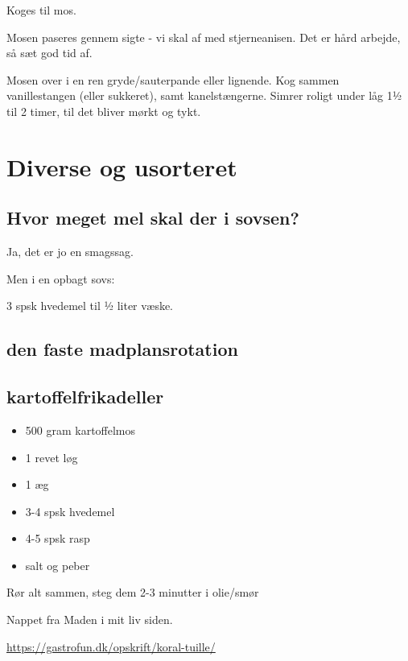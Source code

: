 \documentclass[
]{book}
\providecommand{\tightlist}{%
  \setlength{\itemsep}{0pt}\setlength{\parskip}{0pt}}
\begin{document}
Koges til mos.

Mosen paseres gennem sigte - vi skal af med stjerneanisen.
Det er hård arbejde, så sæt god tid af.

Mosen over i en ren gryde/sauterpande eller lignende.
Kog sammen vanillestangen (eller sukkeret), samt kanelstængerne.
Simrer roligt under låg 1½ til 2 timer, til det bliver mørkt og tykt.

\hypertarget{diverse-og-usorteret}{%
\chapter{Diverse og usorteret}\label{diverse-og-usorteret}}

\hypertarget{hvor-meget-mel-skal-der-i-sovsen}{%
\section{Hvor meget mel skal der i sovsen?}\label{hvor-meget-mel-skal-der-i-sovsen}}

Ja, det er jo en smagssag.

Men i en opbagt sovs:

3 spsk hvedemel til ½ liter væske.

\hypertarget{den-faste-madplansrotation}{%
\section{den faste madplansrotation}\label{den-faste-madplansrotation}}

\hypertarget{kartoffelfrikadeller}{%
\section{kartoffelfrikadeller}\label{kartoffelfrikadeller}}

\begin{itemize}
\tightlist
\item
  500 gram kartoffelmos
\item
  1 revet løg
\item
  1 æg
\item
  3-4 spsk hvedemel
\item
  4-5 spsk rasp
\item
  salt og peber
\end{itemize}

Rør alt sammen, steg dem 2-3 minutter i olie/smør

Nappet fra Maden i mit liv siden.

\url{https://gastrofun.dk/opskrift/koral-tuille/}
\end{document}
